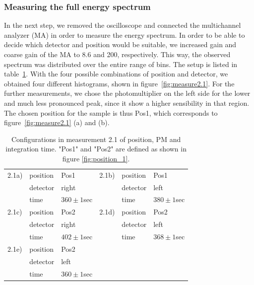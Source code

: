 \subsubsection{Measuring the full energy spectrum}
\label{ssub:Measuring the full energy spectrum}
In the next step, we removed the oscilloscope and connected the multichannel analyzer (MA)
in order to measure the energy spectrum. In order to be able to decide which detector and position would
be suitable, we increased gain and coarse gain of the MA to 8.6 and 200, respectively.
This way, the observed spectrum was distributed over the entire range of bins. 
The setup is listed in table~\ref{tab:config2}. With the four possible combinations
of position and detector, we obtained four different histograms, shown in figure~\ref{fig:measure2.1}.
For the further measurements, we chose the photomultiplier on the left side for the lower and much less 
pronounced peak, since it show a higher sensibility in that region. The 
chosen position for the sample is thus Pos1, which corresponds to figure~\ref{fig:measure2.1} (a) and (b).
\begin{table}[htp]
    \begin{tabular}{|l|l|l||l|l|l|}
        \hline
        2.1a) & position  & Pos1         & 2.1b) & position  & Pos1\\
              & detector          & right        &       & detector          & left \\
              & time        & $360\pm1$sec &       & time        & $380\pm1$sec \\
        \hline 
        2.1c) & position  & Pos2         & 2.1d) & position  & Pos2         \\
              & detector          & right        &       & detector          & left \\
              & time        & $402\pm1$sec &       & time        & $368\pm1$sec \\
        \hline 
        2.1e) & position  & Pos2         \\
              & detector          & left \\
              & time        & $360\pm1$sec \\
    \cline{1-3}
    \end{tabular}
    \caption{
        Configurations in measurement 2.1 of position, PM and integration time. 
        "Pos1" and "Pos2" are defined as shown in figure \ref{fig:position_1}. 
        }
    \label{tab:config2}
\end{table}

